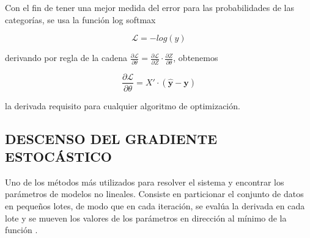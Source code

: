         Con el fin de tener una mejor medida del error para las probabilidades de las categorías, se usa la función log softmax
        
        \begin{equation}
            \mathcal{L} = -log(\hat{y})
        \end{equation}
        
        \noindent derivando por regla de la cadena $\frac{\partial\mathcal{L}}{\partial \theta} = \frac{\partial\mathcal{L}}{\partial Z} \cdot \frac{\partial Z}{\partial \theta}$, obtenemos
        
        \begin{equation}
            \frac{\partial\mathcal{L}}{\partial \theta} = X' \cdot (\mathbf{\hat{y}} - \mathbf{y})
        \end{equation}
        
        \noindent la derivada requisito para cualquier algoritmo de optimización.
        
    \subsection{DESCENSO DEL GRADIENTE ESTOCÁSTICO}
        Uno de los métodos más utilizados para resolver el sistema y encontrar los parámetros de modelos no lineales. Consiste en particionar el conjunto de datos en pequeños lotes, de modo que en cada iteración, se evalúa la derivada en cada lote y se mueven los valores de los parámetros en dirección al mínimo de la función \citep{hastie01statisticallearning}.
        

